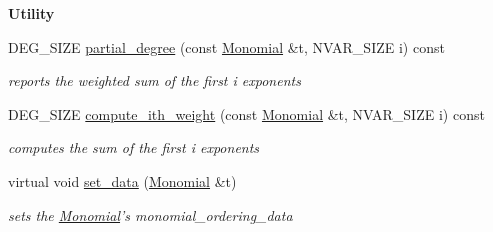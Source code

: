 \begin{Indent}{\bf Utility}\par
\begin{DoxyCompactItemize}
\item 
D\+E\+G\+\_\+\+S\+I\+ZE \hyperlink{class_w_grevlex___ordering_a7d728408f2249cf113604bd1f3f6255e}{partial\+\_\+degree} (const \hyperlink{class_monomial}{Monomial} \&t, N\+V\+A\+R\+\_\+\+S\+I\+ZE i) const 
\begin{DoxyCompactList}\small\item\em reports the weighted sum of the first i exponents \end{DoxyCompactList}\item 
D\+E\+G\+\_\+\+S\+I\+ZE \hyperlink{class_w_grevlex___ordering_a96baa5c85bd43d8650564620d47bb6d4}{compute\+\_\+ith\+\_\+weight} (const \hyperlink{class_monomial}{Monomial} \&t, N\+V\+A\+R\+\_\+\+S\+I\+ZE i) const \hypertarget{class_w_grevlex___ordering_a96baa5c85bd43d8650564620d47bb6d4}{}\label{class_w_grevlex___ordering_a96baa5c85bd43d8650564620d47bb6d4}

\begin{DoxyCompactList}\small\item\em computes the sum of the first i exponents \end{DoxyCompactList}\item 
virtual void \hyperlink{class_w_grevlex___ordering_aabe5ec3071d70738a3cdf0808c134f5a}{set\+\_\+data} (\hyperlink{class_monomial}{Monomial} \&t)\hypertarget{class_w_grevlex___ordering_aabe5ec3071d70738a3cdf0808c134f5a}{}\label{class_w_grevlex___ordering_aabe5ec3071d70738a3cdf0808c134f5a}

\begin{DoxyCompactList}\small\item\em sets the \hyperlink{class_monomial}{Monomial}'s {\ttfamily monomial\+\_\+ordering\+\_\+data} \end{DoxyCompactList}\end{DoxyCompactItemize}
\end{Indent}
